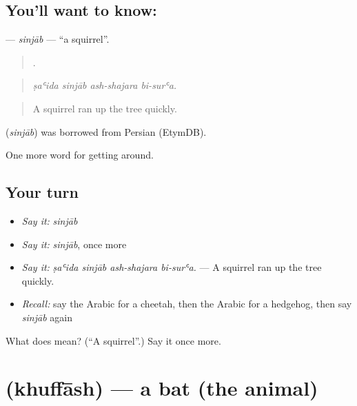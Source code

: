 \subsection*{You'll want to know: }
\textbf{} — \emph{sinjāb} — \textquotedblleft{}a squirrel\textquotedblright{}.

\begin{quote}
   .
\end{quote}

\begin{quote}
\emph{ṣaʿida sinjāb ash-shajara bi-surʿa.}
\end{quote}

\begin{quote}
A squirrel ran up the tree quickly.
\end{quote}

\begin{cousinweb}
\textbf{} (\emph{sinjāb}) was borrowed from Persian (EtymDB).
\end{cousinweb}

\begin{grammarlens}[title={What you've built}]
One more word for getting around.
\end{grammarlens}

\subsection*{Your turn}
\begin{itemize}
\raggedright
  \item \emph{Say it:} \emph{sinjāb}
  \item \emph{Say it:} \emph{sinjāb}, once more
  \item \emph{Say it:} \emph{ṣaʿida sinjāb ash-shajara bi-surʿa.} — A squirrel ran up the tree quickly.
  \item \emph{Recall:} say the Arabic for a cheetah, then the Arabic for a hedgehog, then say \emph{sinjāb} again
\end{itemize}

\begin{tcolorbox}[breakable,colback=teal!4,colframe=teal!35!black,title={Before you move on}]
What does  mean? (\textquotedblleft{}A squirrel\textquotedblright{}.) Say it once more.
\end{tcolorbox}
\section[\texorpdfstring{\ar{خفاش} (khuffāsh)}{خفاش (khuffāsh)}]{ (khuffāsh) — a bat (the animal)}

